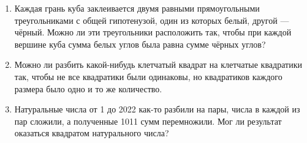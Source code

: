 \documentclass{article}
\begin{document}
\begin{enumerate}[label*=\protect\fbox{\arabic{enumi}}]
\item Каждая грань куба заклеивается двумя равными прямоугольными треугольниками с общей гипотенузой, один из которых белый, другой — чёрный. Можно ли эти треугольники расположить так, чтобы при каждой вершине куба сумма белых углов была равна сумме чёрных углов? 

\item Можно ли разбить какой-нибудь клетчатый квадрат на клетчатые квадратики так, чтобы не все квадратики были одинаковы, но квадратиков каждого размера было одно и то же количество.
	
\item Натуральные числа от 1 до 2022 как-то разбили на пары, числа в каждой из пар сложили, а полученные 1011 сумм перемножили. 
Мог ли результат оказаться квадратом натурального числа?
	
\end{enumerate}
\end{document}
